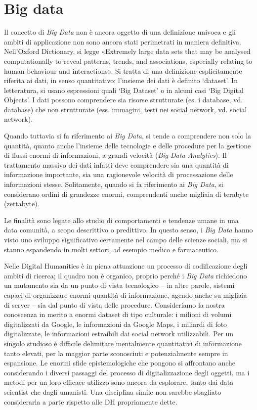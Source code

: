 \chapter{Big data}

Il concetto di \emph{Big Data} non è ancora oggetto di una definizione
univoca e gli ambiti di applicazione non sono ancora stati perimetrati
in maniera definitiva. Nell'Oxford Dictionary, si legge «Extremely large
data sets that may be analysed computationally to reveal patterns,
trends, and associations, especially relating to human behaviour and
interactions». Si tratta di una definizione esplicitamente riferita ai
dati, in senso quantitativo; l'insieme dei dati è definito `dataset'. In
letteratura, si usano espressioni quali `Big Dataset' o in alcuni casi
`Big Digital Objects'. I dati possono comprendere sia risorse
strutturate (es. i database, vd. database) che non strutturate (ess.
immagini, testi nei social network, vd. social network).

Quando tuttavia si fa riferimento ai \emph{Big Data}, si tende a
comprendere non solo la quantità, quanto anche l'insieme delle
tecnologie e delle procedure per la gestione di flussi enormi di
informazioni, a grandi velocità (\emph{Big Data Analytics}). Il
trattamento massivo dei dati infatti deve comprendere sia una quantità
di informazione importante, sia una ragionevole velocità di
processazione delle informazioni stesse. Solitamente, quando si fa
riferimento ai \emph{Big Data}, si considerano ordini di grandezze
enormi, comprendenti anche migliaia di terabyte (zettabyte).

Le finalità sono legate allo studio di comportamenti e tendenze umane in
una data comunità, a scopo descrittivo o predittivo. In questo senso, i
\emph{Big Data} hanno visto uno sviluppo significativo certamente nel
campo delle scienze sociali, ma si stanno espandendo in molti settori,
ad esempio medico e farmaceutico.

Nelle Digital Humanities è in piena attuazione un processo di
codificazione degli ambiti di ricerca; il quadro non è organico, proprio
perché i \emph{Big Data} richiedono un mutamento sia da un punto di
vista tecnologico -- in altre parole, sistemi capaci di organizzare
enormi quantità di informazione, agendo anche su migliaia di server --
sia dal punto di vista delle procedure. Consideriamo la nostra
conoscenza in merito a enormi dataset di tipo culturale: i milioni di
volumi digitalizzati da Google, le informazioni da Google Maps, i
miliardi di foto digitalizzate, le informazioni estraibili dai social
network utilizzabili. Per un singolo studioso è difficile delimitare
mentalmente quantitativi di informazione tanto elevati, per la maggior
parte sconosciuti e potenzialmente sempre in espansione. Le enormi sfide
epistemologiche che pongono si affrontano anche considerando i diversi
passaggi del processo di digitalizzazione degli oggetti, ma i metodi per
un loro efficace utilizzo sono ancora da esplorare, tanto dai data
scientist che dagli umanisti. Una disciplina simile non sarebbe
sbagliato considerarla a parte rispetto alle DH propriamente dette.

